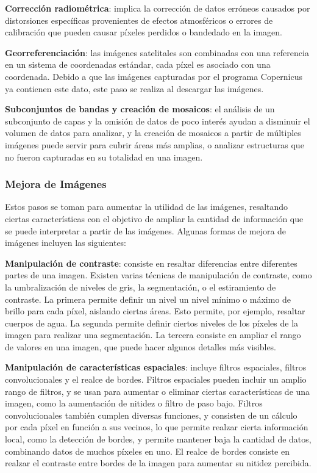 {\bf Corrección radiométrica}: implica la corrección de datos erróneos causados por distorsiones específicas
provenientes de efectos atmosféricos o errores de calibración que pueden causar píxeles perdidos o bandedado en la
imagen. \autocite{lillesand-remote-sensing}

{\bf Georreferenciación}: las imágenes satelitales son combinadas con una referencia en un sistema de coordenadas
estándar, cada píxel es asociado con una coordenada. Debido a que las imágenes capturadas por el programa Copernicus ya
contienen este dato, este paso se realiza al descargar las imágenes. \autocite{lillesand-remote-sensing}

{\bf Subconjuntos de bandas y creación de mosaicos}: el análisis de un subconjunto de capas y la omisión de datos de
poco interés ayudan a disminuir el volumen de datos para analizar, y la creación de mosaicos a partir de múltiples
imágenes puede servir para cubrir áreas más amplias, o analizar estructuras que no fueron capturadas en su totalidad en
una imagen. \autocite{lillesand-remote-sensing}

\subsubsection{Mejora de Imágenes}

Estos pasos se toman para aumentar la utilidad de las imágenes, resaltando ciertas características con el objetivo de
ampliar la cantidad de información que se puede interpretar a partir de las imágenes. Algunas formas de mejora de
imágenes incluyen las siguientes:

{\bf Manipulación de contraste}: consiste en resaltar diferencias entre diferentes partes de una imagen. Existen varias
técnicas de manipulación de contraste, como la umbralización de niveles de gris, la segmentación, o el estiramiento de
contraste. La primera permite definir un nivel un nivel mínimo o máximo de brillo para cada píxel, aislando ciertas
áreas. Esto permite, por ejemplo, resaltar cuerpos de agua. La segunda permite definir ciertos niveles de los píxeles
de la imagen para realizar una segmentación. La tercera consiste en ampliar el rango de valores en una imagen, que
puede hacer algunos detalles más visibles. \autocite{lillesand-remote-sensing}

{\bf Manipulación de características espaciales}: incluye filtros espaciales, filtros convolucionales y el realce de
bordes. Filtros espaciales pueden incluir un amplio rango de filtros, y se usan para aumentar o eliminar ciertas
características de una imagen, como la aumentación de nitidez o filtro de paso bajo. Filtros convolucionales también
cumplen diversas funciones, y consisten de un cálculo por cada píxel en función a sus vecinos, lo que permite realzar
cierta información local, como la detección de bordes, y permite mantener baja la cantidad de datos, combinando datos
de muchos píxeles en uno. El realce de bordes consiste en realzar el contraste entre bordes de la imagen para aumentar
su nitidez percibida. \autocite{lillesand-remote-sensing, usgs-spatial-filters}

